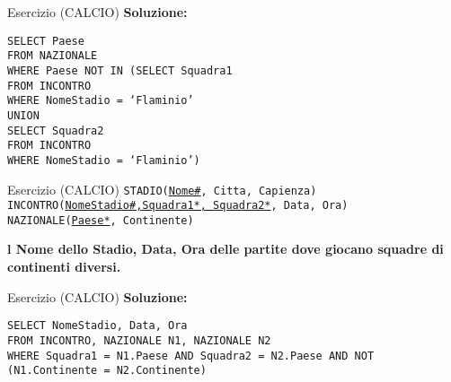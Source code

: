 \begin{frame}{Esercizio (CALCIO)}
    \textbf{Soluzione:}
    \vspace{1em}
    
    \texttt{SELECT Paese\\FROM NAZIONALE\\WHERE Paese NOT IN (SELECT Squadra1 \\\hspace{10em}FROM INCONTRO \\\hspace{10em}WHERE NomeStadio = `Flaminio'
\\\hspace{10em}UNION\\\hspace{10em}SELECT Squadra2 \\\hspace{10em}FROM INCONTRO \\\hspace{10em}WHERE NomeStadio = `Flaminio')}
\end{frame}
\begin{frame}{Esercizio (CALCIO) } 
    \texttt{STADIO(\underline{Nome\#}, Citta, Capienza)\\
    INCONTRO(\underline{NomeStadio\#,Squadra1*, Squadra2*}, Data, Ora)\\
    NAZIONALE(\underline{Paese*}, Continente)}
    \vspace{1em}
    
    \textbf{l Nome dello Stadio, Data, Ora delle partite dove giocano squadre di continenti diversi.}
\end{frame}

\begin{frame}{Esercizio (CALCIO)}
    \textbf{Soluzione:}
    \vspace{1em}
    
    \texttt{SELECT NomeStadio, Data, Ora\\FROM INCONTRO, NAZIONALE N1, NAZIONALE N2\\WHERE Squadra1 = N1.Paese AND Squadra2 = N2.Paese AND NOT (N1.Continente = N2.Continente)}
\end{frame}
